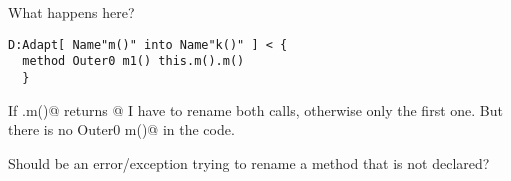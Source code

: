 \begin{frame}[fragile]
What happens here?
\begin{NiceCode}{59ex}{0.8}
\begin{lstlisting}
D:Adapt[ Name"m()" into Name"k()" ] < {
  method Outer0 m1() this.m().m()
  }
\end{lstlisting}
\end{NiceCode}

If \Q@this.m()@ returns @ I have to rename both calls,
otherwise only the first one.
But there is no \Q@method Outer0 m()@
in the code.

Should be an error/exception trying to rename
a method that is not declared?

\end{frame}



